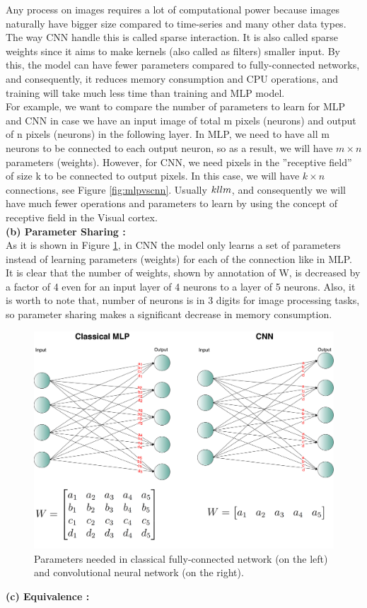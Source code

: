 Any process on images requires a lot of computational power because images naturally have bigger size compared to time-series and many other data types.  The way CNN handle this is called sparse interaction.  It is also called sparse weights since it aims to make kernels (also called as filters) smaller input.  By this, the model can have fewer parameters compared to fully-connected networks, and consequently, it reduces memory consumption and CPU operations,  and training will take much less time than training and MLP model.\\

For example, we want to compare the number of parameters to learn for MLP and CNN in case we have an input image of total m pixels (neurons)  and output of n pixels (neurons) in the following layer.  In MLP,  we need to have all m neurons to be connected to each output neuron, so as a result, we will have $m \times n$ parameters (weights).  However, for CNN, we need pixels in the ”receptive field” of size k to be connected to output pixels. In this case, we will have $k \times n$ connections, see Figure \ref{fig:mlpvscnn}. Usually $k \\ll m$, and consequently we will have much fewer operations and parameters to learn by using the concept of receptive field in the Visual cortex. \\

\textbf{(b) Parameter Sharing :}\\

As it is shown in Figure \ref{fig:prsharing}, in CNN the model only learns a set of parameters instead of learning parameters (weights)  for each of the connection like in MLP. It is clear that the number of weights, shown by annotation of W, is decreased by a factor of 4 even for an input layer of 4 neurons to a layer of 5 neurons.  Also, it is worth to note that, number of neurons is in 3 digits for image processing tasks, so parameter sharing makes a significant decrease in memory consumption. \\
\begin{figure}[h!]
	\centering
  \includegraphics[width=0.8\linewidth, height=0.5\linewidth ]{figures/parameter_sharing} 
  \caption{Parameters needed in classical fully-connected network (on the left) and convolutional neural network (on the right).}
  \label{fig:prsharing}
\end{figure}
\clearpage
\textbf{(c) Equivalence :}\\

